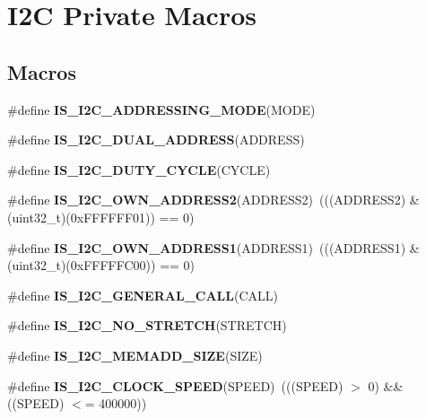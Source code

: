 \hypertarget{group___i2_c___private___macro}{\section{I2\-C Private Macros}
\label{group___i2_c___private___macro}
}
\subsection*{Macros}
\begin{DoxyCompactItemize}
\item 
\#define {\bfseries I\-S\-\_\-\-I2\-C\-\_\-\-A\-D\-D\-R\-E\-S\-S\-I\-N\-G\-\_\-\-M\-O\-D\-E}(M\-O\-D\-E)
\item 
\#define {\bfseries I\-S\-\_\-\-I2\-C\-\_\-\-D\-U\-A\-L\-\_\-\-A\-D\-D\-R\-E\-S\-S}(A\-D\-D\-R\-E\-S\-S)
\item 
\#define {\bfseries I\-S\-\_\-\-I2\-C\-\_\-\-D\-U\-T\-Y\-\_\-\-C\-Y\-C\-L\-E}(C\-Y\-C\-L\-E)
\item 
\hypertarget{group___i2_c___private___macro_ga83001d53612b83ee90730d3bb2732537}{\#define {\bfseries I\-S\-\_\-\-I2\-C\-\_\-\-O\-W\-N\-\_\-\-A\-D\-D\-R\-E\-S\-S2}(A\-D\-D\-R\-E\-S\-S2)~(((A\-D\-D\-R\-E\-S\-S2) \& (uint32\-\_\-t)(0x\-F\-F\-F\-F\-F\-F01)) == 0)}\label{group___i2_c___private___macro_ga83001d53612b83ee90730d3bb2732537}

\item 
\hypertarget{group___i2_c___private___macro_gad84e8b9523d45b6105b4d5cb68994a79}{\#define {\bfseries I\-S\-\_\-\-I2\-C\-\_\-\-O\-W\-N\-\_\-\-A\-D\-D\-R\-E\-S\-S1}(A\-D\-D\-R\-E\-S\-S1)~(((A\-D\-D\-R\-E\-S\-S1) \& (uint32\-\_\-t)(0x\-F\-F\-F\-F\-F\-C00)) == 0)}\label{group___i2_c___private___macro_gad84e8b9523d45b6105b4d5cb68994a79}

\item 
\#define {\bfseries I\-S\-\_\-\-I2\-C\-\_\-\-G\-E\-N\-E\-R\-A\-L\-\_\-\-C\-A\-L\-L}(C\-A\-L\-L)
\item 
\#define {\bfseries I\-S\-\_\-\-I2\-C\-\_\-\-N\-O\-\_\-\-S\-T\-R\-E\-T\-C\-H}(S\-T\-R\-E\-T\-C\-H)
\item 
\#define {\bfseries I\-S\-\_\-\-I2\-C\-\_\-\-M\-E\-M\-A\-D\-D\-\_\-\-S\-I\-Z\-E}(S\-I\-Z\-E)
\item 
\hypertarget{group___i2_c___private___macro_gae0d731df1b264d853703716c29309b9b}{\#define {\bfseries I\-S\-\_\-\-I2\-C\-\_\-\-C\-L\-O\-C\-K\-\_\-\-S\-P\-E\-E\-D}(S\-P\-E\-E\-D)~(((S\-P\-E\-E\-D) $>$ 0) \&\& ((S\-P\-E\-E\-D) $<$= 400000))}\label{group___i2_c___private___macro_gae0d731df1b264d853703716c29309b9b}


\end{DoxyCompactItemize}
